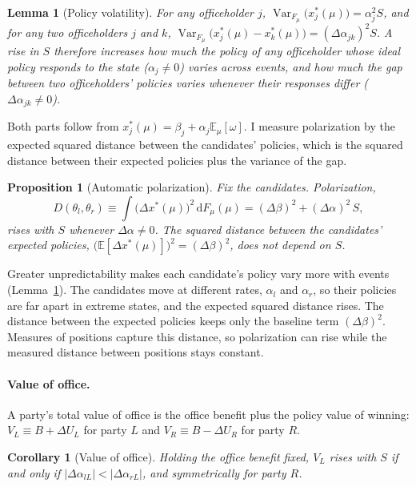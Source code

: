 \documentclass[12pt,letterpaper]{article}
\newtheorem{corollary}{Corollary}
\newtheorem{proposition}{Proposition}
\newtheorem{lemma}{Lemma}
\begin{document}
\begin{lemma}[Policy volatility]\label{lem:volatility}
For any officeholder $j$, $\operatorname{Var}_{F_\mu}\big(x^*_j(\mu)\big)=\alpha_j^2 S$, and for any two officeholders $j$ and $k$, $\operatorname{Var}_{F_\mu}\big(x^*_j(\mu)-x^*_k(\mu)\big)=(\Delta\alpha_{jk})^2 S$. A rise in $S$ therefore increases how much the policy of any officeholder whose ideal policy responds to the state ($\alpha_j\neq0$) varies across events, and how much the gap between two officeholders' policies varies whenever their responses differ ($\Delta\alpha_{jk}\neq0$).
\end{lemma}

Both parts follow from $x^*_j(\mu)=\beta_j+\alpha_j\mathbb{E}_\mu[\omega]$. I measure polarization by the expected squared distance between the candidates' policies, which is the squared distance between their expected policies plus the variance of the gap.

\begin{proposition}[Automatic polarization]\label{prop:auto-polar}
Fix the candidates. Polarization,
\[
D(\theta_l,\theta_r)\equiv\int\big(\Delta x^*(\mu)\big)^2\,\mathrm{d}F_\mu(\mu)=(\Delta\beta)^2+(\Delta\alpha)^2\,S ,
\]
rises with $S$ whenever $\Delta\alpha\ne0$. The squared distance between the candidates' expected policies, $\big(\mathbb{E}[\Delta x^*(\mu)]\big)^2=(\Delta\beta)^2$, does not depend on $S$.
\end{proposition}

Greater unpredictability makes each candidate's policy vary more with events (Lemma~\ref{lem:volatility}). The candidates move at different rates, $\alpha_l$ and $\alpha_r$, so their policies are far apart in extreme states, and the expected squared distance rises. The distance between the expected policies keeps only the baseline term $(\Delta\beta)^2$. Measures of positions capture this distance, so polarization can rise while the measured distance between positions stays constant.

\paragraph{Value of office.}
A party's total value of office is the office benefit plus the policy value of winning: $V_L\equiv B+\Delta U_L$ for party $L$ and $V_R\equiv B-\Delta U_R$ for party $R$.

\begin{corollary}[Value of office]\label{cor:office}
Holding the office benefit fixed, $V_L$ rises with $S$ if and only if $|\Delta\alpha_{lL}|<|\Delta\alpha_{rL}|$, and symmetrically for party $R$.
\end{corollary}
\end{document}
